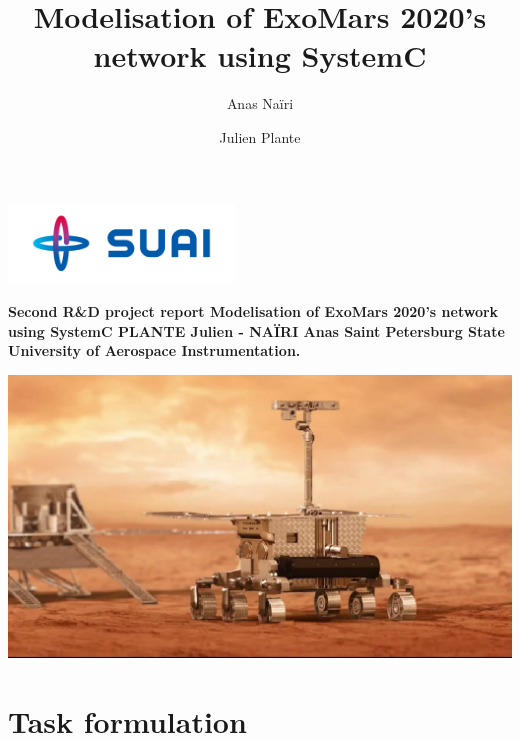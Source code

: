 \documentclass[12pt,a4paper]{article}
\author{Anas Naïri \and Julien Plante}
\title{Modelisation of ExoMars 2020's network using SystemC}
\begin{document}
\begin{titlepage}

\includegraphics[width = 60mm]{pictures/suai.png}

    \vspace*{\fill}

    \begin{center}
    
        \Huge\bfseries
        Second R\&D project report
        \vskip10pt
        \Large\bfseries
        Modelisation of ExoMars 2020's network using SystemC
        \vskip10pt
        \large
        PLANTE Julien - NAÏRI Anas
        \vskip20pt
        \large
        Saint Petersburg State University of Aerospace Instrumentation.
        \vskip20pt
        
        \vspace*{\fill}
        \includegraphics[scale = 0.2]{pictures/Exomars2020.png}
    \end{center}
    
    \vspace*{\fill}

\end{titlepage}

\pagebreak

\tableofcontents

\pagebreak

\section{Task formulation}
\end{document}
